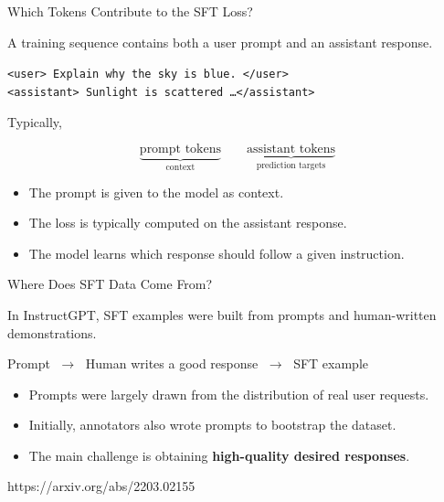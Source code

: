 \documentclass[11pt,compress,t,notes=noshow, xcolor=table]{beamer}
\begin{document}

\begin{vbframe}{Which Tokens Contribute to the SFT Loss?}

A training sequence contains both a user prompt and an assistant response.

\begin{center}
\texttt{<user> Explain why the sky is blue. </user>}\\
\texttt{<assistant> Sunlight is scattered \ldots </assistant>}
\end{center}

Typically,

\[
\underbrace{\text{prompt tokens}}_{\text{context}}
\qquad
\underbrace{\text{assistant tokens}}_{\text{prediction targets}}
\]

\begin{itemize}
    \item The prompt is given to the model as context.
    \item The loss is typically computed on the assistant response.
    \item The model learns which response should follow a given instruction.
\end{itemize}

\end{vbframe}



\begin{vbframe}{Where Does SFT Data Come From?}

In InstructGPT, SFT examples were built from prompts and
human-written demonstrations.

\begin{center}
Prompt
$\;\longrightarrow\;$
Human writes a good response
$\;\longrightarrow\;$
SFT example
\end{center}

\begin{itemize}
    \item Prompts were largely drawn from the distribution of real user requests.
    \item Initially, annotators also wrote prompts to bootstrap the dataset.
    \item The main challenge is obtaining \textbf{high-quality desired responses}.
\end{itemize}

{https://arxiv.org/abs/2203.02155}

\end{vbframe}
\end{document}
